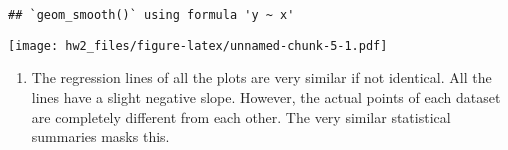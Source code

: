 \documentclass[
]{article}
\providecommand{\tightlist}{%
  \setlength{\itemsep}{0pt}\setlength{\parskip}{0pt}}
\begin{document}
\begin{verbatim}
## `geom_smooth()` using formula 'y ~ x'
\end{verbatim}

\texttt{[image: hw2\_files/figure-latex/unnamed-chunk-5-1.pdf]}

\begin{enumerate}
\def\labelenumi{\arabic{enumi}.}
\setcounter{enumi}{1}
\tightlist
\item
  The regression lines of all the plots are very similar if not
  identical. All the lines have a slight negative slope. However, the
  actual points of each dataset are completely different from each
  other. The very similar statistical summaries masks this.
\end{enumerate}
\end{document}
